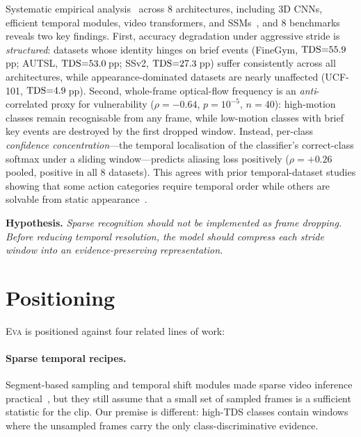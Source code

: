 \documentclass[10pt,twocolumn]{article}
\newcommand{\EVA}{\textsc{Eva}}
\newcommand{\TDS}{\ifmmode\mathrm{TDS}\else\textsc{TDS}\fi}
\begin{document}
Systematic empirical analysis~\cite{anon2026} across 8 architectures, including
3D CNNs, efficient temporal modules, video transformers, and SSMs~\cite{c3d,slowfast,timesformer,vivit,videomae,videomamba},
and 8 benchmarks reveals two key findings.
First, accuracy degradation under aggressive stride is \emph{structured}:
datasets whose identity hinges on brief events (FineGym, $\TDS{=}55.9$\,pp;
AUTSL, $\TDS{=}53.0$\,pp; SSv2, $\TDS{=}27.3$\,pp) suffer consistently across
all architectures, while appearance-dominated datasets are nearly unaffected
(UCF-101, $\TDS{=}4.9$\,pp).
Second, whole-frame optical-flow frequency is an \emph{anti}-correlated proxy
for vulnerability ($\rho{=}{-}0.64$, $p{=}10^{-5}$, $n{=}40$):
high-motion classes remain recognisable from any frame, while low-motion
classes with brief key events are destroyed by the first dropped window.
Instead, per-class \emph{confidence concentration}---the temporal localisation
of the classifier's correct-class softmax under a sliding window---predicts
aliasing loss positively ($\rho{=}{+}0.26$ pooled, positive in all 8 datasets).
This agrees with prior temporal-dataset studies showing that some action
categories require temporal order while others are solvable from static
appearance~\cite{huang2018makes,sevilla2021only}.

\textbf{Hypothesis.} \textit{Sparse recognition should not be implemented as
frame dropping. Before reducing temporal resolution, the model should compress
each stride window into an evidence-preserving representation.}

\section{Positioning}
\label{sec:positioning}

\EVA{} is positioned against four related lines of work:

\paragraph{Sparse temporal recipes.}
Segment-based sampling and temporal shift modules made sparse video inference
practical~\cite{tsn,tsm}, but they still assume that a small set of sampled
frames is a sufficient statistic for the clip. Our premise is different:
high-\TDS{} classes contain windows where the unsampled frames carry the only
class-discriminative evidence.
\end{document}
